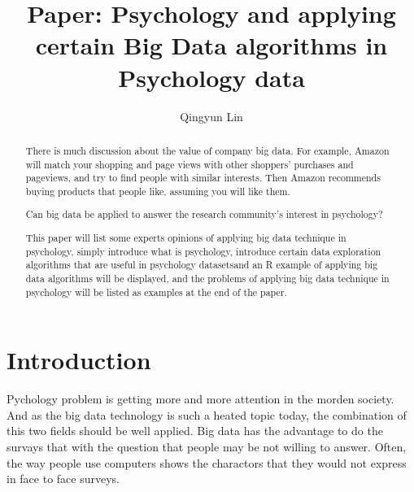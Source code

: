 
\title{Paper: Psychology and applying certain Big Data 
algorithms in Psychology data}


\author{Qingyun Lin}


\renewcommand{\shortauthors}{G. v. Laszewski}


\begin{abstract}
There is much discussion about the value of company big data. 
For example, Amazon will match your shopping and page views with 
other shoppers’ purchases and pageviews, and try to find people with 
similar interests. Then Amazon recommends buying products that people 
like, assuming you will like them.

Can big data be applied to answer the research community’s interest 
in psychology?

This paper will list some experts opinions of applying big data 
technique in psychology, simply introduce what is psychology, 
introduce certain data exploration algorithms that are useful in 
psychology datasetsand an R example of applying big data algorithms 
will be displayed, and the problems of applying big data technique 
in psychology will be listed as examples at the end of the paper. 

\end{abstract}



\maketitle

\section{Introduction}

Pychology problem is getting more and more attention in the morden
society. And as the big data technology is such a heated topic 
today, the combination of this two fields should be well applied.
Big data has the advantage to do the survays that with the question 
that people may be not willing to answer. 
Often, the way people use computers shows the charactors that they
 would not express in face to face surveys.

